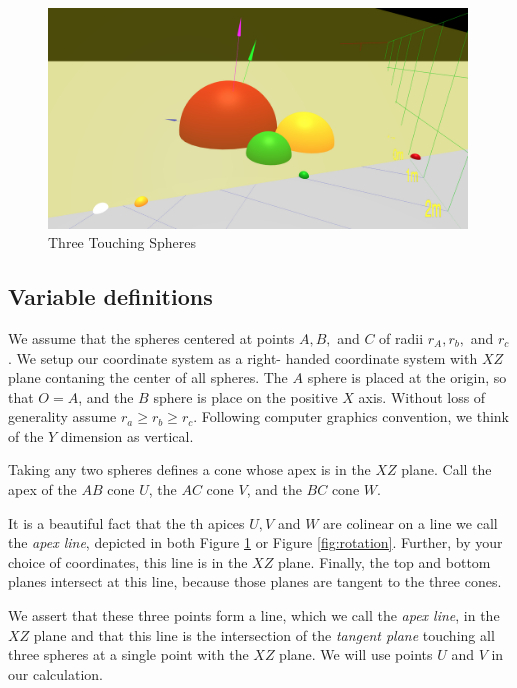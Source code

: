 \documentclass{article}
\begin{document}
\begin{figure}
     \centering
     \includegraphics[width=0.99\textwidth]{figures/StandardThreeSphereDiagram.png}
     \caption{Three Touching Spheres}
  \label{fig:fixed}
\end{figure}

\subsection{Variable definitions}

We assume that the spheres centered at points $A,B,$ and $C$
of radii $r_A,r_b,$ and $r_c$. We setup our coordinate system as a right-
handed coordinate system with $XZ$ plane contaning the center of all spheres.
The $A$ sphere is placed at the origin, so that $O = A$, and the $B$ sphere
is place on the positive $X$ axis. Without loss of generality assume $r_a \geq r_b \geq r_c$.
Following computer graphics convention, we think of the $Y$ dimension as vertical.

Taking any two spheres defines a cone whose apex is in the $XZ$ plane.
Call the apex of the $AB$ cone $U$, the $AC$ cone $V$, and the $BC$ cone $W$.

It is a beautiful fact that the th apices $U,V$ and $W$ are colinear
on a line we call the {\em apex line}, depicted in both Figure \ref{fig:fixed}
or Figure \ref{fig:rotation}.
Further, by your choice of coordinates,
this line is in the $XZ$ plane. Finally, the top and bottom planes
intersect at this line, because those planes are tangent to the three cones.

We assert that these three points form a line, which we call the {\em apex line}, in the $XZ$ plane and that this
line is the intersection of the {\em tangent plane} touching all three spheres at a single point
with the $XZ$ plane. We will use points $U$ and $V$ in our calculation.
\end{document}
